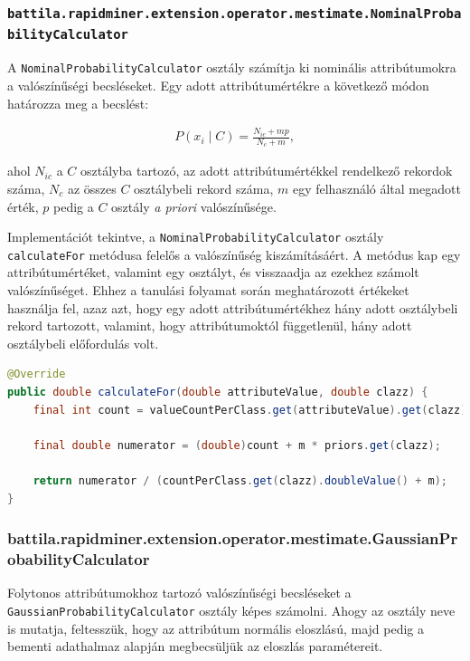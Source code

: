 \documentclass[a4paper]{article}
\begin{document}
\subsubsection{\texttt{battila.rapidminer.extension.operator.mestimate.NominalProbabilityCalculator}}

A \texttt{NominalProbabilityCalculator} osztály számítja ki nominális attribútumokra a valószínűségi becsléseket. Egy adott attribútumértékre a következő módon határozza meg a becslést:

\begin{align*}
P(x_i \; | \; C) = \frac{N_{ic} + mp}{N_{c} + m},
\end{align*}

ahol $N_{ic}$ a $C$ osztályba tartozó, az adott attribútumértékkel rendelkező rekordok száma, $N_{c}$ az összes $C$ osztálybeli rekord száma, $m$ egy felhasználó által megadott érték, $p$ pedig a $C$ osztály \textit{a priori} valószínűsége.

Implementációt tekintve, a \texttt{NominalProbabilityCalculator} osztály \texttt{calculateFor} metódusa felelős a valószínűség kiszámításáért. A metódus kap egy attribútumértéket, valamint egy osztályt, és visszaadja az ezekhez számolt valószínűséget. Ehhez a tanulási folyamat során meghatározott értékeket használja fel, azaz azt, hogy egy adott attribútumértékhez hány adott osztálybeli rekord tartozott, valamint, hogy attribútumoktól függetlenül, hány adott osztálybeli előfordulás volt.

\pagebreak

\begin{lstlisting}[language=Java, caption={Nominális attribútum feltételes valószínűségének kiszámítása.}, captionpos=b, escapechar=$]
@Override
public double calculateFor(double attributeValue, double clazz) {
    final int count = valueCountPerClass.get(attributeValue).get(clazz);

    final double numerator = (double)count + m * priors.get(clazz);

    return numerator / (countPerClass.get(clazz).doubleValue() + m);
}
\end{lstlisting}

\subsubsection{battila.rapidminer.extension.operator.mestimate.GaussianProbabilityCalculator}

Folytonos attribútumokhoz tartozó valószínűségi becsléseket a \texttt{GaussianProbabilityCalculator} osztály képes számolni. Ahogy az osztály neve is mutatja, feltesszük, hogy az attribútum normális eloszlású, majd pedig a bementi adathalmaz alapján megbecsüljük az eloszlás paramétereit.
\end{document}
